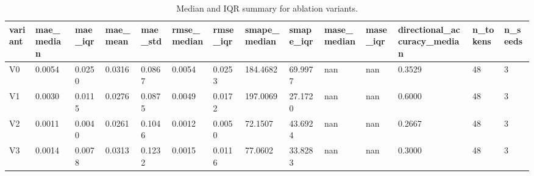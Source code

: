 \begin{table}[htbp]
\centering
\begin{tabular}{llllllllllllll}
\hline
variant & mae_median & mae_iqr & mae_mean & mae_std & rmse_median & rmse_iqr & smape_median & smape_iqr & mase_median & mase_iqr & directional_accuracy_median & n_tokens & n_seeds \\
\hline
V0 & 0.0054 & 0.0250 & 0.0316 & 0.0867 & 0.0054 & 0.0253 & 184.4682 & 69.9977 & nan & nan & 0.3529 & 48 & 3 \\
V1 & 0.0030 & 0.0115 & 0.0276 & 0.0875 & 0.0049 & 0.0172 & 197.0069 & 27.1720 & nan & nan & 0.6000 & 48 & 3 \\
V2 & 0.0011 & 0.0040 & 0.0261 & 0.1046 & 0.0012 & 0.0050 & 72.1507 & 43.6924 & nan & nan & 0.2667 & 48 & 3 \\
V3 & 0.0014 & 0.0078 & 0.0313 & 0.1232 & 0.0015 & 0.0116 & 77.0602 & 33.8283 & nan & nan & 0.3000 & 48 & 3 \\
\hline
\end{tabular}
\caption{Median and IQR summary for ablation variants.}
\label{table_ablation_median_iqr}
\end{table}